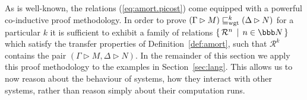 \documentclass{LMCS}
\newcommand{\with}{\mathbin \rhd}
\newcommand{\nats}{\ensuremath{\bbb N}\xspace}
\newcommand{\amort}[1]{\mathrel{\sqsubseteq_{\rm wgt}^{#1}}}
\newcommand{\setof}[2]{\{ \, #1 \, \mid \, #2 \, \}}\newcommand{\sset}[1]{\{ {#1}  \}  }
\newcommand{\calR}{\mathbin{\mathcal{R}}}
\begin{document}
As is well-known, the relations (\ref{eq:amort.picost}) come equipped with a powerful co-inductive
proof methodology. In order to prove 
\begin{math}
   (\Gamma \with M) \amort{k} (\Delta \with N)
\end{math}
for a particular $k$ it is sufficient to exhibit a family of relations 
$\setof{\calR^n}{n \in \nats}$ which satisfy the transfer properties of 
Definition~\ref{def:amort}, such that $\calR^k$ contains the pair 
$(\Gamma \with M,\Delta \with N)$. 
In the remainder of this section we apply this proof methodology to the 
examples in Section~\ref{sec:lang}. This allows us to   now reason about the behaviour of
systems, how they  interact with other systems, rather than reason simply about their computation
runs. 
\end{document}
